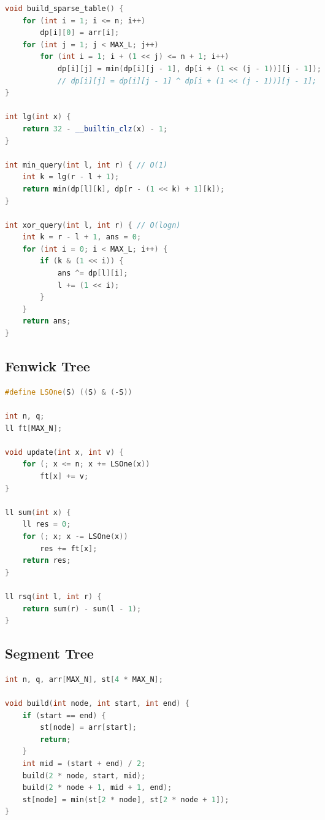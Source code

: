 \documentclass{article}
\begin{document}
\begin{multicols}{2}
\begin{lstlisting}[linewidth=\columnwidth,breaklines=true,language=C++]
void build_sparse_table() {
    for (int i = 1; i <= n; i++)
        dp[i][0] = arr[i];
    for (int j = 1; j < MAX_L; j++)
        for (int i = 1; i + (1 << j) <= n + 1; i++)
            dp[i][j] = min(dp[i][j - 1], dp[i + (1 << (j - 1))][j - 1]);
            // dp[i][j] = dp[i][j - 1] ^ dp[i + (1 << (j - 1))][j - 1];
}

int lg(int x) {
    return 32 - __builtin_clz(x) - 1;
}

int min_query(int l, int r) { // O(1)
    int k = lg(r - l + 1);
    return min(dp[l][k], dp[r - (1 << k) + 1][k]);
}

int xor_query(int l, int r) { // O(logn)
    int k = r - l + 1, ans = 0;
    for (int i = 0; i < MAX_L; i++) {
        if (k & (1 << i)) {
            ans ^= dp[l][i];
            l += (1 << i);
        }
    }
    return ans;
}

\end{lstlisting}
\subsection{Fenwick Tree}
\lstset {    language=C++,
    basicstyle=\small\ttfamily,
    numbers=left,
    breaklines=true,
    tabsize=4}
\begin{lstlisting}[linewidth=\columnwidth,breaklines=true,language=C++]
#define LSOne(S) ((S) & (-S))

int n, q;
ll ft[MAX_N];
 
void update(int x, int v) {
    for (; x <= n; x += LSOne(x))
        ft[x] += v;
}
 
ll sum(int x) {
    ll res = 0;
    for (; x; x -= LSOne(x)) 
        res += ft[x];
    return res;
}
 
ll rsq(int l, int r) {
    return sum(r) - sum(l - 1);
}

\end{lstlisting}
\subsection{Segment Tree}
\lstset {    language=C++,
    basicstyle=\small\ttfamily,
    numbers=left,
    breaklines=true,
    tabsize=4}
\begin{lstlisting}[linewidth=\columnwidth,breaklines=true,language=C++]
int n, q, arr[MAX_N], st[4 * MAX_N];
 
void build(int node, int start, int end) {
    if (start == end) {
        st[node] = arr[start];
        return;
    }
    int mid = (start + end) / 2;
    build(2 * node, start, mid);
    build(2 * node + 1, mid + 1, end);
    st[node] = min(st[2 * node], st[2 * node + 1]);
}
 

\end{lstlisting}
\end{multicols}
\end{document}
